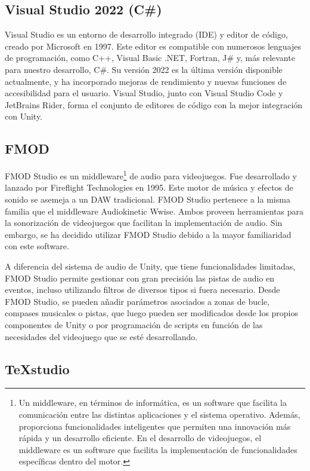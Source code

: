 \subsection{Visual Studio 2022 (C\#)}

Visual Studio es un entorno de desarrollo integrado (IDE) y editor de código, creado por Microsoft en 1997. Este editor es compatible con numerosos lenguajes de programación, como C++, Visual Basic .NET, Fortran, J\# y, más relevante para nuestro desarrollo, C\#. Su versión 2022 es la última versión disponible actualmente, y ha incorporado mejoras de rendimiento y nuevas funciones de accesibilidad para el usuario. Visual Studio, junto con Visual Studio Code y JetBrains Rider, forma el conjunto de editores de código con la mejor integración con Unity.

\subsection{FMOD}

FMOD Studio es un middleware\footnote{Un middleware, en términos de informática, es un software que facilita la comunicación entre las distintas aplicaciones y el sistema operativo. Además, proporciona funcionalidades inteligentes que permiten una innovación más rápida y un desarrollo eficiente. En el desarrollo de videojuegos, el middleware es un software que facilita la implementación de funcionalidades específicas dentro del motor.} de audio para videojuegos. Fue desarrollado y lanzado por Fireflight Technologies en 1995. Este motor de música y efectos de sonido se asemeja a un DAW tradicional. FMOD Studio pertenece a la misma familia que el middleware Audiokinetic Wwise. Ambos proveen herramientas para la sonorización de videojuegos que facilitan la implementación de audio. Sin embargo, se ha decidido utilizar FMOD Studio debido a la mayor familiaridad con este software.

A diferencia del sistema de audio de Unity, que tiene funcionalidades limitadas, FMOD Studio permite gestionar con gran precisión las pistas de audio en eventos, incluso utilizando filtros de diversos tipos si fuera necesario. Desde FMOD Studio, se pueden añadir parámetros asociados a zonas de bucle, compases musicales o pistas, que luego pueden ser modificados desde los propios componentes de Unity o por programación de scripts en función de las necesidades del videojuego que se esté desarrollando.

\subsection{TeXstudio}

